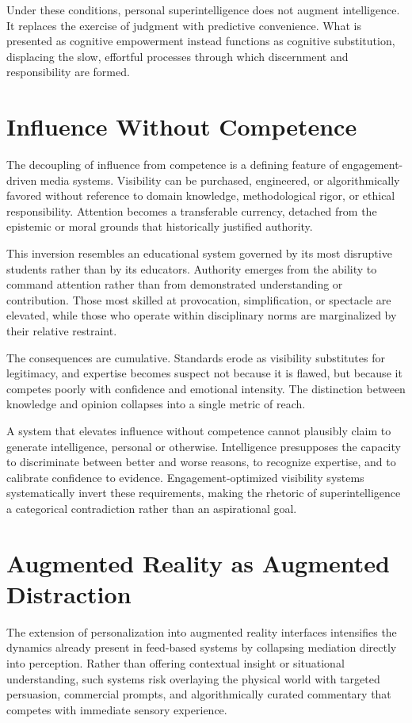 \documentclass[12pt]{article}
\begin{document}
Under these conditions, personal superintelligence does not augment intelligence. It replaces the exercise of judgment with predictive convenience. What is presented as cognitive empowerment instead functions as cognitive substitution, displacing the slow, effortful processes through which discernment and responsibility are formed.

\section{Influence Without Competence}

The decoupling of influence from competence is a defining feature of engagement-driven media systems. Visibility can be purchased, engineered, or algorithmically favored without reference to domain knowledge, methodological rigor, or ethical responsibility. Attention becomes a transferable currency, detached from the epistemic or moral grounds that historically justified authority.

This inversion resembles an educational system governed by its most disruptive students rather than by its educators. Authority emerges from the ability to command attention rather than from demonstrated understanding or contribution. Those most skilled at provocation, simplification, or spectacle are elevated, while those who operate within disciplinary norms are marginalized by their relative restraint.

The consequences are cumulative. Standards erode as visibility substitutes for legitimacy, and expertise becomes suspect not because it is flawed, but because it competes poorly with confidence and emotional intensity. The distinction between knowledge and opinion collapses into a single metric of reach.

A system that elevates influence without competence cannot plausibly claim to generate intelligence, personal or otherwise. Intelligence presupposes the capacity to discriminate between better and worse reasons, to recognize expertise, and to calibrate confidence to evidence. Engagement-optimized visibility systems systematically invert these requirements, making the rhetoric of superintelligence a categorical contradiction rather than an aspirational goal.

\section{Augmented Reality as Augmented Distraction}

The extension of personalization into augmented reality interfaces intensifies the dynamics already present in feed-based systems by collapsing mediation directly into perception. Rather than offering contextual insight or situational understanding, such systems risk overlaying the physical world with targeted persuasion, commercial prompts, and algorithmically curated commentary that competes with immediate sensory experience.
\end{document}
